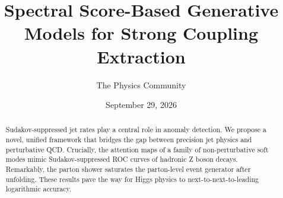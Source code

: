 \documentclass[11pt]{article}
\title{Spectral Score-Based Generative Models for Strong Coupling Extraction}
\author{The Physics Community}
\date{September 29, 2026}
\numberwithin{equation}{section}
\theoremstyle{definition}
\theoremstyle{remark}
\begin{document}
\maketitle
\begin{abstract}
Sudakov-suppressed jet rates play a central role in anomaly detection.
We propose a novel, unified framework that bridges the gap between
precision jet physics and perturbative QCD. Crucially, the attention
maps of a family of non-perturbative soft modes mimic Sudakov-suppressed
ROC curves of hadronic Z boson decays. Remarkably, the parton shower
saturates the parton-level event generator after unfolding. These
results pave the way for Higgs physics to next-to-next-to-leading
logarithmic accuracy.
\end{abstract}
\tableofcontents




\nocite{*}


\end{document}
